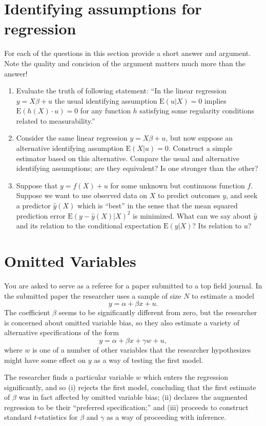 \documentclass[12pt]{amsart}
\newcommand{\E}{\ensuremath{\mbox{E}}}
\begin{document}
\section{Identifying assumptions for regression}
\label{sec:org7b183fe}
For each of the questions in this section provide a short answer and
argument.  Note the quality and concision of the argument 
matters much more than the answer!
\begin{enumerate}
\item Evaluate the truth of following statement: ``In the linear
regression \(y=X\beta + u\) the usual identifying assumption
\(\E(u|X)=0\) implies \(\E(h(X)\cdot u)=0\) for any function \(h\)
satisfying some regularity conditions related to measurability.''
\item Consider the same linear regression \(y=X\beta + u\), but now
suppose an alternative identifying assumption \(\E(X|u)=0\).  
Construct a simple estimator based on this alternative.  Compare
the usual and alternative identifying assumptions; are they
equivalent?  Is one stronger than the other?
\item Suppose that \(y=f(X)+u\) for some unknown but continuous function
\(f\).  Suppose we want to use observed data on \(X\) to predict
outcomes \(y\), and seek a predictor \(\hat{y}(X)\) which is ``best''
in the sense that the mean squared prediction error \(\E
     (y-\hat{y}(X)|X)^2\) is minimized.  What can we say about
\(\hat{y}\) and its relation to the conditional expectation
\(\E(y|X)\)?  Its relation to \(u\)?
\end{enumerate}

\section{Omitted Variables}
\label{sec:orgca4950d}
You are asked to serve as a referee for a paper submitted to a top
field journal.  In the submitted paper the researcher uses a sample
of size \(N\) to estimate a model
\[
     y = \alpha + \beta x + u.
  \]
The coefficient \(\beta\) seems to be significantly different from
zero, but the researcher is concerned about omitted variable bias,
so they also estimate a variety of alternative specifications of the form
\[
     y = \alpha + \beta x + \gamma w + u,
  \]
where \(w\) is one of a number of other variables that the researcher
hypothesizes might have some effect on \(y\) as a way of testing the
first model.

The researcher finds a particular variable \(w\) which enters the
regression significantly, and so (i) rejects the first model,
concluding that the first estimate of \(\beta\) was in fact affected by
omitted variable bias; (ii) declares the augmented regression to be
their ``preferred specification;'' and (iii) proceeds to construct
standard \(t\)-statistics for \(\beta\) and \(\gamma\) as a way of
proceeding with inference.
\end{document}
